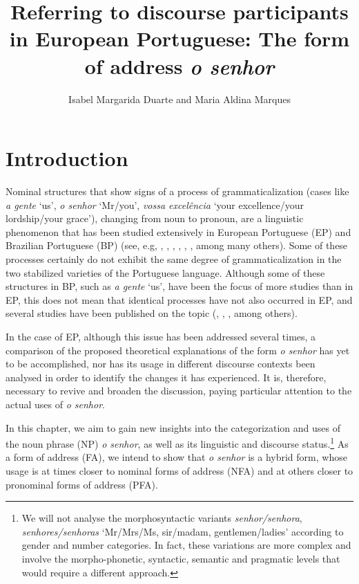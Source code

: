 \documentclass[output=paper]{langscibook}
\author{Isabel Margarida Duarte\orcid{0000-0001-7908-5649}\affiliation{Universidade do Porto} and Maria Aldina Marques\orcid{0000-0003-3263-1977}\affiliation{Universidade do Minho}}
\title[Referring to discourse participants in European Portuguese]
	  {Referring to discourse participants in European Portuguese: The form of address \textit{o senhor}}
\begin{document}
\maketitle 



\section{Introduction}\label{sec:marques:1}

Nominal structures that show signs of a process of grammaticalization (cases like \textit{a gente} ‘us’, \textit{o senhor} ‘Mr/you’, \textit{vossa excelência} ‘your excellence/your lordship/your grace’), changing from noun to pronoun, are a linguistic phenomenon that has been studied extensively in European Portuguese (EP) and Brazilian Portuguese (BP) (see, e.g, \citealt{Cintra1972}, \citealt{Nascimento1987}, \citealt{Cook1994}, \citealt{Faraco1996}, \citealt{Pereira2003}, \citealt{Sória2013}, among many others). Some of these processes certainly do not exhibit the same degree of grammaticalization in the two stabilized varieties of the Portuguese language. Although some of these structures in BP, such as \textit{a gente} ‘us’, have been the focus of more studies than in EP, this does not mean that identical processes have not also occurred in EP, and several studies have been published on the topic (\citealt{Nascimento1987}, \citealt{Pereira2003}, \citealt{Posio2021}, among others). 



In the case of EP, although this issue has been addressed several times, a comparison of the proposed theoretical explanations of the form \textit{o senhor} has yet to be accomplished, nor has its usage in different discourse contexts been analysed in order to identify the changes it has experienced. It is, therefore, necessary to revive and broaden the discussion, paying particular attention to the actual uses of \textit{o senhor}. 



In this chapter, we aim to gain new insights into the categorization and uses of the noun phrase (NP) \textit{o senhor}, as well as its linguistic and discourse status.\footnote{We will not analyse the morphosyntactic variants \textit{senhor/senhora}, \textit{senhores/senhoras} ‘Mr\slash Mrs\slash Ms, sir\slash madam, gentlemen\slash ladies’ according to gender and number categories. In fact, these variations are more complex and involve the morpho-phonetic, syntactic, semantic and pragmatic levels that would require a different approach.} As a form of address (FA), we intend to show that \textit{o senhor} is a hybrid form, whose usage is at times closer to nominal forms of address (NFA) and at others closer to pronominal forms of address (PFA).  
\end{document}
